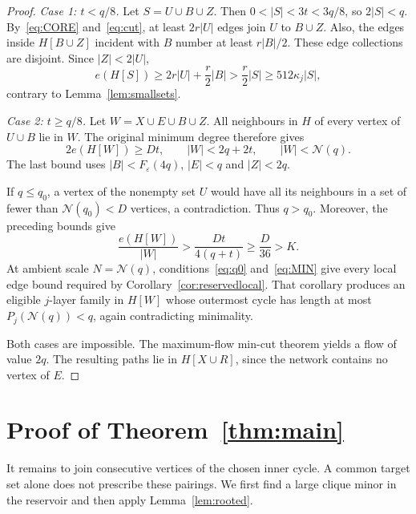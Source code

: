 \documentclass[10pt,letterpaper]{article}
\theoremstyle{definition}
\theoremstyle{remark}
\newcommand{\eps}{\varepsilon}
\begin{document}
\begin{proof}
\medskip
\noindent\emph{Case 1: $t<q/8$.}
Let $S=U\cup B\cup Z$. Then $0<|S|<3t<3q/8$, so $2|S|<q$. By~\eqref{eq:CORE} and~\eqref{eq:cut}, at least $2r|U|$ edges join $U$ to $B\cup Z$. Also, the edges inside $H[B\cup Z]$ incident with $B$ number at least $r|B|/2$. These edge collections are disjoint. Since $|Z|<2|U|$,
\[
e(H[S])\ge2r|U|+\frac r2|B|
>\frac r2|S|\ge512\kappa_j|S|,
\]
contrary to Lemma~\ref{lem:smallsets}.

\medskip
\noindent\emph{Case 2: $t\ge q/8$.}
Let $W=X\cup E\cup B\cup Z$. All neighbours in $H$ of every vertex of $U\cup B$ lie in $W$. The original minimum degree therefore gives
\[
2e(H[W])\ge Dt,\qquad
|W|<2q+2t,\qquad |W|<\mathcal N(q).
\]
The last bound uses $|B|<F_\eps(4q)$, $|E|<q$ and $|Z|<2q$.

If $q\le q_0$, a vertex of the nonempty set $U$ would have all its neighbours in a set of fewer than $\mathcal N(q_0)<D$ vertices, a contradiction. Thus $q>q_0$. Moreover, the preceding bounds give
\[
\frac{e(H[W])}{|W|}>\frac{Dt}{4(q+t)}\ge\frac D{36}>K.
\]
At ambient scale $N=\mathcal N(q)$, conditions~\eqref{eq:q0} and~\eqref{eq:MIN} give every local edge bound required by Corollary~\ref{cor:reservedlocal}. That corollary produces an eligible $j$-layer family in $H[W]$ whose outermost cycle has length at most $P_j(\mathcal N(q))<q$, again contradicting minimality.

Both cases are impossible. The maximum-flow min-cut theorem yields a flow of value $2q$. The resulting paths lie in $H[X\cup R]$, since the network contains no vertex of $E$.
\end{proof}

\section{Proof of Theorem~\ref{thm:main}}\label{sec:proof}

It remains to join consecutive vertices of the chosen inner cycle. A common target set alone does not prescribe these pairings. We first find a large clique minor in the reservoir and then apply Lemma~\ref{lem:rooted}.
\end{document}
